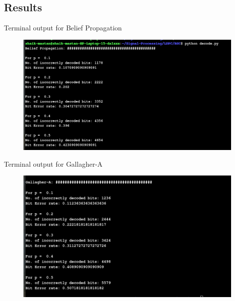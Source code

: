 \subsection{Results}
\begin{frame}
\begin{exampleblock}{Terminal output for Belief Propagation}
    \begin{figure}
		\includegraphics[width=\textwidth]{BSC/terminalBSC_1.png}
	\end{figure}
\end{exampleblock}
\end{frame}

\begin{frame}
\begin{exampleblock}{Terminal output for Gallagher-A}
    \begin{figure}
		\includegraphics[width=\textwidth]{BSC/terminalBSC_2.png}
	\end{figure}
\end{exampleblock}
\end{frame}

